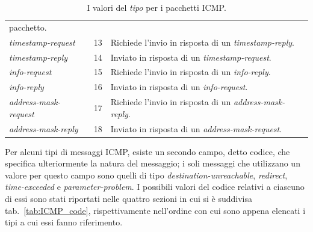 \begin{table}[!htb]
\begin{tabular}{|l|l|p{9.5cm}|}
                                         pacchetto.\\
    \textit{timestamp-request}      &13& Richiede l'invio in risposta di un
                                         \textit{timestamp-reply}.\\
    \textit{timestamp-reply}        &14& Inviato in risposta di un
                                         \textit{timestamp-request}.\\
    \textit{info-request}           &15& Richiede l'invio in risposta di un
                                         \textit{info-reply}.\\
    \textit{info-reply}             &16& Inviato in risposta di un
                                         \textit{info-request}.\\
    \textit{address-mask-request}   &17& Richiede l'invio in risposta di un
                                         \textit{address-mask-reply}.\\
    \textit{address-mask-reply}     &18& Inviato in risposta di un
                                         \textit{address-mask-request}.\\
    \hline
  \end{tabular}
  \caption{I valori del \textsl{tipo} per i pacchetti ICMP.}
\label{tab:ICMP_type}
\end{table}

Per alcuni tipi di messaggi ICMP, esiste un secondo campo, detto codice, che
specifica ulteriormente la natura del messaggio; i soli messaggi che
utilizzano un valore per questo campo sono quelli di tipo
\textit{destination-unreachable}, \textit{redirect}, \textit{time-exceeded} e
\textit{parameter-problem}. I possibili valori del codice relativi a ciascuno
di essi sono stati riportati nelle quattro sezioni in cui si è suddivisa
tab.~\ref{tab:ICMP_code}, rispettivamente nell'ordine con cui sono appena
elencati i tipi a cui essi fanno riferimento. 

